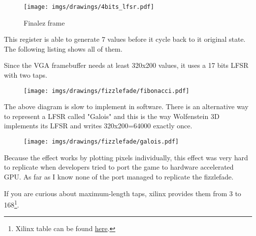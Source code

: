 \begin{figure}[H]
 \centering
  \texttt{[image: imgs/drawings/4bits\_lfsr.pdf]}
 \caption{Finalez frame} 
\end{figure}
This register is able to generate 7 values before it cycle back to it original state. The following listing shows all of them.
\par
\begin{minipage}{\textwidth}

\end{minipage}
\par
Since the VGA framebuffer needs at least 320x200 values, it uses a 17 bits LFSR with two taps.\\
\par
\begin{figure}[H] \centering \texttt{[image: imgs/drawings/fizzlefade/fibonacci.pdf]} \end{figure}
\par
The above diagram is slow to implement in software. There is an alternative way to represent a LFSR called "Galois" and this is the way Wolfenstein 3D implements its LFSR and writes 320x200=64000 exactly once.
\par
\begin{figure}[H] \centering \texttt{[image: imgs/drawings/fizzlefade/galois.pdf]} \end{figure}
      
 Because the effect works by plotting pixels individually, this effect was very hard to replicate when developers tried to port the game to hardware accelerated GPU. As far as I know none of the port managed to replicate the fizzlefade.\\
\par
{} If you are curious about maximum-length taps, xilinx provides them from 3 to 168\footnote{Xilinx table can be found \href{http://www.xilinx.com/support/documentation/application\_notes/xapp052.pdf}{here}.}.










